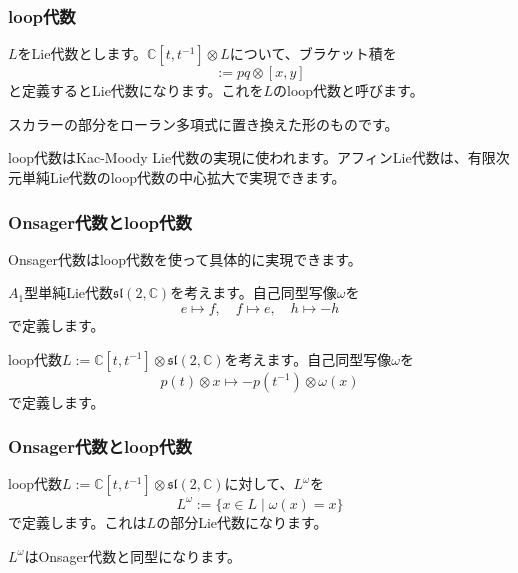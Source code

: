 \documentclass{beamer}
\begin{document}
\begin{frame}
    \frametitle{loop代数}

    \begin{definition}[loop代数]
        $L$をLie代数とします。$ℂ[t,t^{-1}]⊗L$について、ブラケット積を
        \begin{equation}
            [p⊗x,q⊗y]:=pq⊗[x,y]
        \end{equation}
        と定義するとLie代数になります。これを$L$のloop代数と呼びます。
    \end{definition}

    スカラーの部分をローラン多項式に置き換えた形のものです。

    \bigskip

    loop代数はKac-Moody Lie代数の実現に使われます。アフィンLie代数は、有限次元単純Lie代数のloop代数の中心拡大で実現できます。
\end{frame}

\begin{frame}
    \frametitle{Onsager代数とloop代数}

    Onsager代数はloop代数を使って具体的に実現できます。

    \bigskip

    \begin{definition}
        $A_1$型単純Lie代数$\mathfrak{sl}(2,ℂ)$を考えます。自己同型写像$ω$を
        \begin{equation}
            e↦f, \quad f↦e, \quad h↦-h
        \end{equation}
        で定義します。
    \end{definition}

    \begin{definition}
        loop代数$L:=ℂ[t,t^{-1}]⊗\mathfrak{sl}(2,ℂ)$を考えます。自己同型写像$ω$を
        \begin{equation}
            p(t)⊗x↦-p(t^{-1})⊗ω(x)
        \end{equation}
        で定義します。
    \end{definition}
\end{frame}

\begin{frame}
    \frametitle{Onsager代数とloop代数}

    \begin{definition}
        loop代数$L:=ℂ[t,t^{-1}]⊗\mathfrak{sl}(2,ℂ)$に対して、$L^ω$を
        \begin{equation}
            L^ω:=\{x∈L∣ω(x)=x\}
        \end{equation}
        で定義します。これは$L$の部分Lie代数になります。
    \end{definition}

    \begin{theorem}[Onsager代数とloop代数の同型]
        $L^ω$はOnsager代数と同型になります。
    \end{theorem}
\end{frame}
\end{document}
